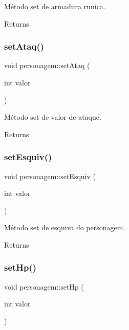 Método set de armadura runica. 

\begin{DoxyReturn}{Returns}

\end{DoxyReturn}
\mbox{\label{classpersonagem_a5f5f95e0fd8e5ceda996925c37cf6c4f}} 
\subsubsection{\texorpdfstring{set\+Ataq()}{setAtaq()}}
{\footnotesize\ttfamily void personagem\+::set\+Ataq (\begin{DoxyParamCaption}\item[{int}]{valor }\end{DoxyParamCaption})}



Método set de valor de ataque. 

\begin{DoxyReturn}{Returns}

\end{DoxyReturn}
\mbox{\label{classpersonagem_ab1c07cf6fcd0831d83ba624af01f9f04}} 
\subsubsection{\texorpdfstring{set\+Esquiv()}{setEsquiv()}}
{\footnotesize\ttfamily void personagem\+::set\+Esquiv (\begin{DoxyParamCaption}\item[{int}]{valor }\end{DoxyParamCaption})}



Método set de esquiva do personagem. 

\begin{DoxyReturn}{Returns}

\end{DoxyReturn}
\mbox{\label{classpersonagem_a9805607809f9b49ab19e3f02f20c86a2}} 
\subsubsection{\texorpdfstring{set\+Hp()}{setHp()}}
{\footnotesize\ttfamily void personagem\+::set\+Hp (\begin{DoxyParamCaption}\item[{int}]{valor }\end{DoxyParamCaption})}



